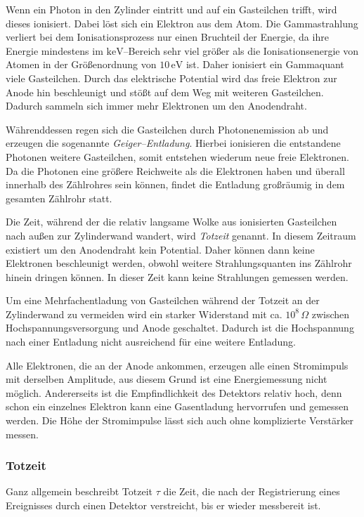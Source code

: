 \documentclass[12pt,a4paper]{scrartcl}
\numberwithin{equation}{section} %
\begin{document}
\noindent
Wenn ein Photon in den Zylinder eintritt und auf ein Gasteilchen trifft, wird dieses ionisiert. Dabei löst sich ein Elektron aus dem Atom. Die Gammastrahlung verliert bei dem Ionisationsprozess nur einen Bruchteil der Energie, da ihre Energie mindestens im $\mathrm{keV}$--Bereich sehr viel größer als die Ionisationsenergie von Atomen in der Größenordnung von $10\mathrm{\,eV}$ ist. Daher ionisiert ein Gammaquant viele Gasteilchen. \cite{Demtröder Kern/Atom} Durch das elektrische Potential wird das freie Elektron zur Anode hin beschleunigt und stößt auf dem Weg mit weiteren Gasteilchen. Dadurch sammeln sich immer mehr Elektronen um den Anodendraht.

Währenddessen regen sich die Gasteilchen durch Photonenemission ab und erzeugen die sogenannte \emph{Geiger--Entladung}. Hierbei ionisieren die entstandene Photonen weitere Gasteilchen, somit entstehen wiederum neue freie Elektronen. Da die Photonen eine größere Reichweite als die Elektronen haben und überall innerhalb des Zählrohres sein können, findet die Entladung großräumig in dem gesamten Zählrohr statt.

Die Zeit, während der die relativ langsame Wolke aus ionisierten Gasteilchen nach außen zur Zylinderwand wandert, wird \emph{Totzeit} genannt. In diesem Zeitraum existiert um den Anodendraht kein Potential. Daher können dann keine Elektronen beschleunigt werden, obwohl weitere Strahlungsquanten ins Zählrohr hinein dringen können. In dieser Zeit kann keine Strahlungen gemessen werden.

Um eine Mehrfachentladung von Gasteilchen während der Totzeit an der Zylinderwand zu vermeiden wird ein starker Widerstand mit ca. $10^8\,\Omega$ zwischen Hochspannungsversorgung und Anode geschaltet. Dadurch ist die Hochspannung nach einer Entladung nicht ausreichend für eine weitere Entladung.

Alle Elektronen, die an der Anode ankommen, erzeugen alle einen Stromimpuls mit derselben Amplitude, aus diesem Grund ist eine Energiemessung nicht möglich. Andererseits ist die Empfindlichkeit des Detektors relativ hoch, denn schon ein einzelnes Elektron kann eine Gasentladung hervorrufen und gemessen werden. Die Höhe der Stromimpulse lässt sich auch ohne komplizierte Verstärker messen.

\subsubsection{Totzeit}
\label{Totzeit}
Ganz allgemein beschreibt Totzeit $\tau$ die Zeit, die nach der Registrierung eines Ereignisses durch einen Detektor verstreicht, bis er wieder messbereit ist. \cite{Totzeit}
\end{document}
